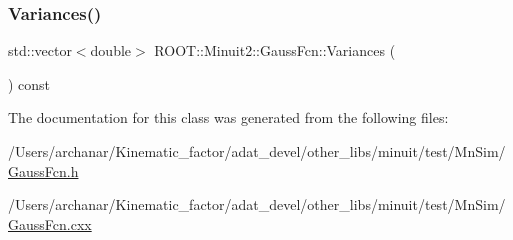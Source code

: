 \mbox{\label{classROOT_1_1Minuit2_1_1GaussFcn_a477d37158239fe260003624d12e8379a}} 
\subsubsection{\texorpdfstring{Variances()}{Variances()}}
{\footnotesize\ttfamily std\+::vector$<$double$>$ R\+O\+O\+T\+::\+Minuit2\+::\+Gauss\+Fcn\+::\+Variances (\begin{DoxyParamCaption}{ }\end{DoxyParamCaption}) const\hspace{0.3cm}{\ttfamily [inline]}}



The documentation for this class was generated from the following files\+:\begin{DoxyCompactItemize}
\item 
/\+Users/archanar/\+Kinematic\+\_\+factor/adat\+\_\+devel/other\+\_\+libs/minuit/test/\+Mn\+Sim/\mbox{\hyperlink{GaussFcn_8h}{Gauss\+Fcn.\+h}}\item 
/\+Users/archanar/\+Kinematic\+\_\+factor/adat\+\_\+devel/other\+\_\+libs/minuit/test/\+Mn\+Sim/\mbox{\hyperlink{GaussFcn_8cxx}{Gauss\+Fcn.\+cxx}}\end{DoxyCompactItemize}
